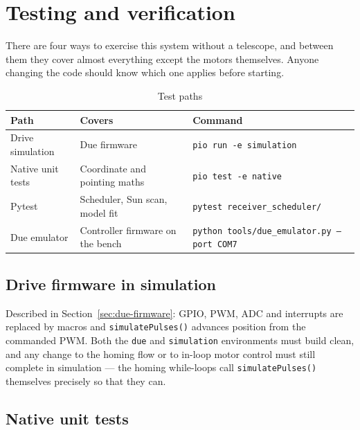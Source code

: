 \documentclass[11pt,a4paper]{article}
\begin{document}
\section{Testing and verification}
\label{sec:testing}

There are four ways to exercise this system without a telescope, and between them they cover almost everything except the motors themselves. Anyone changing the code should know which one applies before starting.

\begin{table}[H]
\centering
\caption{Test paths}
\label{tab:testpaths}
\small
\begin{tabular}{llp{6.6cm}}
\toprule
\textbf{Path} & \textbf{Covers} & \textbf{Command} \\
\midrule
Drive simulation & Due firmware & \texttt{pio run -e simulation} \\
Native unit tests & Coordinate and pointing maths & \texttt{pio test -e native} \\
Pytest & Scheduler, Sun scan, model fit & \texttt{pytest receiver\_scheduler/} \\
Due emulator & Controller firmware on the bench & \texttt{python tools/due\_emulator.py --port COM7} \\
\bottomrule
\end{tabular}
\end{table}

\subsection{Drive firmware in simulation}

Described in Section~\ref{sec:due-firmware}: GPIO, PWM, ADC and interrupts are replaced by macros and \texttt{simulatePulses()} advances position from the commanded PWM. Both the \texttt{due} and \texttt{simulation} environments must build clean, and any change to the homing flow or to in-loop motor control must still complete in simulation --- the homing while-loops call \texttt{simulatePulses()} themselves precisely so that they can.

\subsection{Native unit tests}
\end{document}
